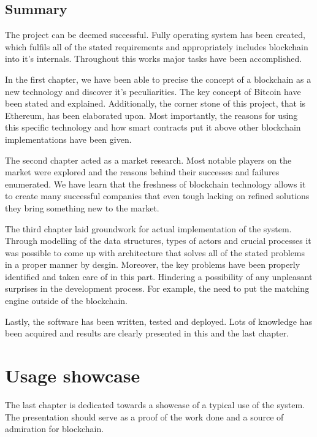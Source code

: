 \documentclass[a4paper,12pt,twoside,openany]{report}
\begin{document}
\section{Summary}

The project can be deemed successful. Fully operating system has been created, which fulfils all of the stated requirements and appropriately includes blockchain into it's internals. Throughout this works major tasks have been accomplished.

In the first chapter, we have been able to precise the concept of a blockchain as a new technology and discover it's peculiarities. The key concept of Bitcoin have been stated and explained. Additionally, the corner stone of this project, that is Ethereum, has been elaborated upon. Most importantly, the reasons for using this specific technology and how smart contracts put it above other blockchain implementations have been given.

The second chapter acted as a market research. Most notable players on the market were explored and the reasons behind their successes and failures enumerated. We have learn that the freshness of blockchain technology allows it to create many successful companies that even tough lacking on refined solutions they bring something new to the market.

The third chapter laid groundwork for actual implementation of the system. Through modelling of the data structures, types of actors and crucial processes it was possible to come up with architecture that solves all of the stated problems in a proper manner by desgin. Moreover, the key problems have been properly identified and taken care of in this part. Hindering a possibility of any unpleasant surprises in the development process. For example, the need to put the matching engine outside of the blockchain.

Lastly, the software has been written, tested and deployed. Lots of knowledge has been acquired and results are clearly presented in this and the last chapter.

\chapter{Usage showcase}

The last chapter is dedicated towards a showcase of a typical use of the system. The presentation should serve as a proof of the work done and a source of admiration for blockchain. 
\end{document}

